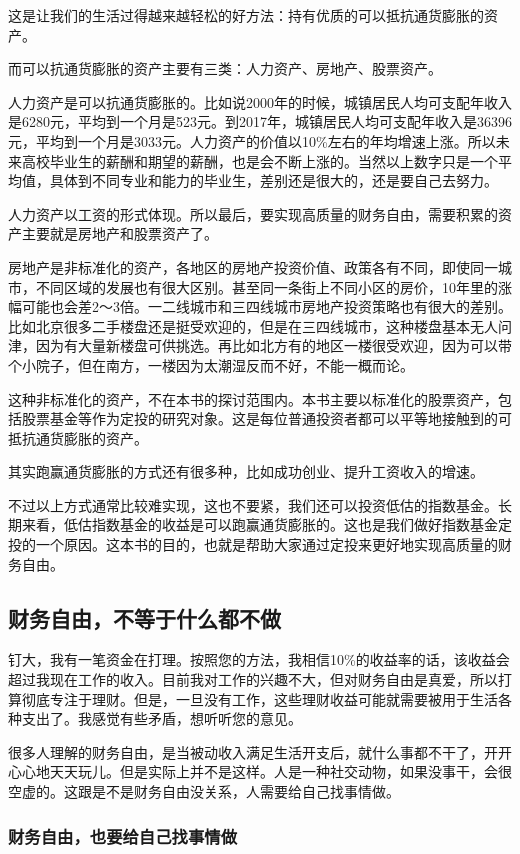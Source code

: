 这是让我们的生活过得越来越轻松的好方法：持有优质的可以抵抗通货膨胀的资产。

而可以抗通货膨胀的资产主要有三类：人力资产、房地产、股票资产。

人力资产是可以抗通货膨胀的。比如说2000年的时候，城镇居民人均可支配年收入是6280元，平均到一个月是523元。到2017年，城镇居民人均可支配年收入是36396元，平均到一个月是3033元。人力资产的价值以10\%左右的年均增速上涨。所以未来高校毕业生的薪酬和期望的薪酬，也是会不断上涨的。当然以上数字只是一个平均值，具体到不同专业和能力的毕业生，差别还是很大的，还是要自己去努力。

人力资产以工资的形式体现。所以最后，要实现高质量的财务自由，需要积累的资产主要就是房地产和股票资产了。

房地产是非标准化的资产，各地区的房地产投资价值、政策各有不同，即使同一城市，不同区域的发展也有很大区别。甚至同一条街上不同小区的房价，10年里的涨幅可能也会差2～3倍。一二线城市和三四线城市房地产投资策略也有很大的差别。比如北京很多二手楼盘还是挺受欢迎的，但是在三四线城市，这种楼盘基本无人问津，因为有大量新楼盘可供挑选。再比如北方有的地区一楼很受欢迎，因为可以带个小院子，但在南方，一楼因为太潮湿反而不好，不能一概而论。

这种非标准化的资产，不在本书的探讨范围内。本书主要以标准化的股票资产，包括股票基金等作为定投的研究对象。这是每位普通投资者都可以平等地接触到的可抵抗通货膨胀的资产。

其实跑赢通货膨胀的方式还有很多种，比如成功创业、提升工资收入的增速。

不过以上方式通常比较难实现，这也不要紧，我们还可以投资低估的指数基金。长期来看，低估指数基金的收益是可以跑赢通货膨胀的。这也是我们做好指数基金定投的一个原因。这本书的目的，也就是帮助大家通过定投来更好地实现高质量的财务自由。

\subsection{财务自由，不等于什么都不做}
{\kaishu 钉大，我有一笔资金在打理。按照您的方法，我相信10\%的收益率的话，该收益会超过我现在工作的收入。目前我对工作的兴趣不大，但对财务自由是真爱，所以打算彻底专注于理财。但是，一旦没有工作，这些理财收益可能就需要被用于生活各种支出了。我感觉有些矛盾，想听听您的意见。}

很多人理解的财务自由，是当被动收入满足生活开支后，就什么事都不干了，开开心心地天天玩儿。但是实际上并不是这样。人是一种社交动物，如果没事干，会很空虚的。这跟是不是财务自由没关系，人需要给自己找事情做。

\subsubsection{财务自由，也要给自己找事情做}

